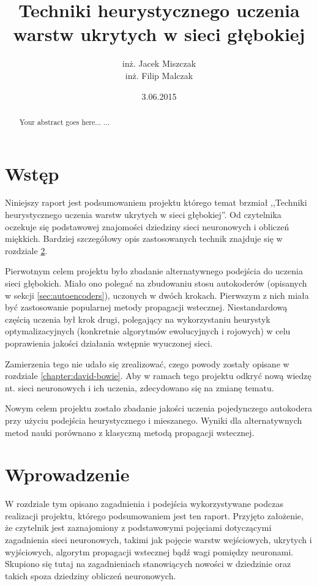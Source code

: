 \documentclass[11pt,a4paper,oneside]{report}
\begin{document}
\title{Techniki heurystycznego uczenia warstw ukrytych w sieci głębokiej}
\author{inż. Jacek Miszczak \\ inż. Filip Malczak}
\date{3.06.2015}
\maketitle

\begin{abstract}
Your abstract goes here...
...
\end{abstract}

\tableofcontents

\chapter{Wstęp}

Niniejszy raport jest podsumowaniem projektu którego temat brzmiał ,,Techniki heurystycznego uczenia warstw ukrytych w sieci głębokiej''. Od czytelnika oczekuje się podstawowej znajomości dziedziny sieci neuronowych i obliczeń miękkich. Bardziej szczegółowy opis zastosowanych technik znajduje się w rozdziale \ref{chap:introduction}.

Pierwotnym celem projektu było zbadanie alternatywnego podejścia do uczenia sieci głębokich. Miało ono polegać na zbudowaniu stosu autokoderów (opisanych w sekcji \ref{sec:autoencoders}), uczonych w dwóch krokach. Pierwszym z nich miała być zastosowanie popularnej metody propagacji wstecznej. Niestandardową częścią uczenia był krok drugi, polegający na wykorzystaniu heurystyk optymalizacyjnych (konkretnie algorytmów ewolucyjnych i rojowych) w celu poprawienia jakości działania wstępnie wyuczonej sieci.

Zamierzenia tego nie udało się zrealizować, czego powody zostały opisane w rozdziale \ref{chapter:david-bowie}. Aby w ramach tego projektu odkryć nową wiedzę nt. sieci neuronowych i ich uczenia, zdecydowano się na zmianę tematu.

Nowym celem projektu zostało zbadanie jakości uczenia pojedynczego autokodera przy użyciu podejścia heurystycznego i mieszanego. Wyniki dla alternatywnych metod nauki porównano z klasyczną metodą propagacji wstecznej.

\chapter{Wprowadzenie}
\label{chap:introduction}

W rozdziale tym opisano zagadnienia i podejścia wykorzystywane podczas realizacji projektu, którego podsumowaniem jest ten raport. Przyjęto założenie, że czytelnik jest zaznajomiony z podstawowymi pojęciami dotyczącymi zagadnienia sieci neuronowych, takimi jak pojęcie warstw wejściowych, ukrytych i wyjściowych, algorytm propagacji wstecznej bądź wagi pomiędzy neuronami. Skupiono się tutaj na zagadnieniach stanowiących nowości w dziedzinie oraz takich spoza dziedziny obliczeń neuronowych.
\end{document}
